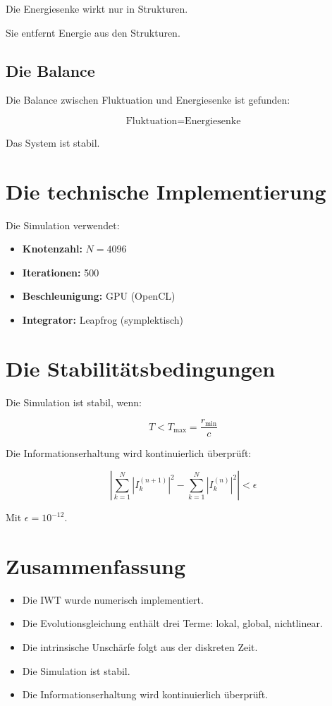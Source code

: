 Die Energiesenke wirkt nur in Strukturen.

Sie entfernt Energie aus den Strukturen.

\subsection{Die Balance}

Die Balance zwischen Fluktuation und Energiesenke ist gefunden:

\[
\text{Fluktuation} = \text{Energiesenke}
\]

Das System ist stabil.

\section{Die technische Implementierung}

Die Simulation verwendet:

\begin{itemize}
\item \textbf{Knotenzahl:} \( N = 4096 \)
\item \textbf{Iterationen:} 500
\item \textbf{Beschleunigung:} GPU (OpenCL)
\item \textbf{Integrator:} Leapfrog (symplektisch)
\end{itemize}

\section{Die Stabilitätsbedingungen}

Die Simulation ist stabil, wenn:

\[
T < T_{\text{max}} = \frac{r_{\text{min}}}{c}
\]

Die Informationserhaltung wird kontinuierlich überprüft:

\[
\left| \sum_{k=1}^{N} |I_k^{(n+1)}|^2 - \sum_{k=1}^{N} |I_k^{(n)}|^2 \right| < \epsilon
\]

Mit \( \epsilon = 10^{-12} \).

\section{Zusammenfassung}

\begin{itemize}
\item Die IWT wurde numerisch implementiert.
\item Die Evolutionsgleichung enthält drei Terme: lokal, global, nichtlinear.
\item Die intrinsische Unschärfe folgt aus der diskreten Zeit.
\item Die Simulation ist stabil.
\item Die Informationserhaltung wird kontinuierlich überprüft.
\end{itemize}